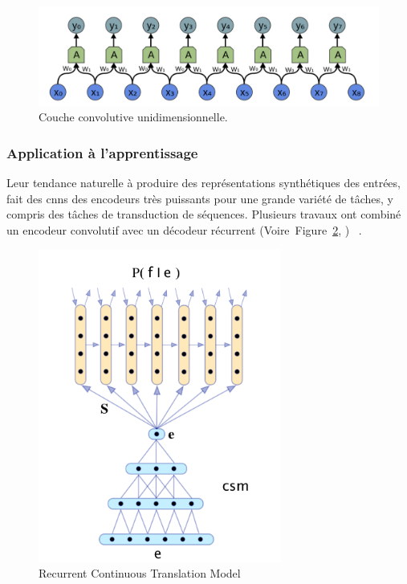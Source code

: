 \begin{figure}[hbt]
    \begin{center}
        \includegraphics[width=\textwidth]{assets/images/conv1d.png}
    \end{center}    
    \caption{Couche convolutive unidimensionnelle.}
    \label{fig.layer-conv1d}
\end{figure}


\subsubsection{Application à l'apprentissage }

Leur tendance naturelle à produire des représentations synthétiques des entrées,
fait des \glspl{cnn} des encodeurs très puissants pour une grande variété de tâches,
y compris des tâches de transduction de séquences.
Plusieurs travaux ont combiné un encodeur convolutif avec un décodeur récurrent%
(Voire~Figure~\ref{fig.rctm}, )%
~\cite{deep-nmt-survey}.

\begin{figure}[hbt]
    \centering
    \includegraphics[width=8cm]{assets/images/ctrm.png}
    \caption{Recurrent Continuous Translation Model}
    \label{fig.rctm}
\end{figure}

